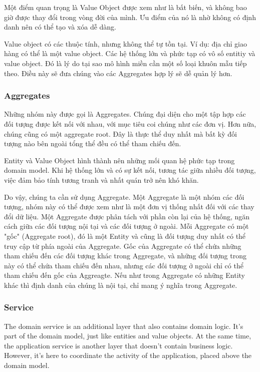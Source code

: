 Một điểm quan trọng là Value Object được xem như là bất biến, và không bao giờ được thay đổi trong vòng đời của mình. Ưu điểm của nó là nhờ không có định danh nên có thể tạo và xóa dễ dàng.

Value object có các thuộc tính, nhưng không thể tự tồn tại. Ví dụ: địa chỉ giao hàng có thể là một value object. Các hệ thống lớn và phức tạp có vô số entitiy và value object. Đó là lý do tại sao mô hình miền cần một số loại khuôn mẫu tiếp theo. Điều này sẽ đưa chúng vào các Aggregates hợp lý sẽ dễ quản lý hơn.

\subsubsection{Aggregates}

Những nhóm này được gọi là Aggregates. Chúng đại diện cho một tập hợp các đối tượng được kết nối với nhau, với mục tiêu coi chúng như các đơn vị. Hơn nữa, chúng cũng có một aggregate root. Đây là thực thể duy nhất mà bất kỳ đối tượng nào bên ngoài tổng thể đều có thể tham chiếu đến.

Entity và Value Object hình thành nên những mối quan hệ phức tạp trong domain model. Khi hệ thống lớn và có sự kết nối, tương tác giữa nhiều đối tượng, việc đảm bảo tính tương tranh và nhất quán trở nên khó khăn.

Do vậy, chúng ta cần sử dụng Aggregate. Một Aggregate là một nhóm các đối tượng, nhóm này có thể được xem như là một đơn vị thống nhất đối với các thay đổi dữ liệu. Một Aggregate được phân tách với phần còn lại của hệ thống, ngăn cách giữa các đối tượng nội tại và các đối tượng ở ngoài. Mỗi Aggregate có một "gốc" (Aggregate root), đó là một Entity và cũng là đối tượng duy nhất có thể truy cập từ phía ngoài của Aggregate. Gốc của Aggregate có thể chứa những tham chiếu đến các đối tượng khác trong Aggregate, và những đối tượng trong này có thể chứa tham chiếu đến nhau, nhưng các đối tượng ở ngoài chỉ có thể tham chiếu đến gốc của Aggreagte. Nếu như trong Aggregate có những Entity khác thì định danh của chúng là nội tại, chỉ mang ý nghĩa trong Aggregate.

\subsubsection{Service}

The domain service is an additional layer that also contains domain logic. It’s part of the domain model, just like entities and value objects. At the same time, the application service is another layer that doesn’t contain business logic. However, it’s here to coordinate the activity of the application, placed above the domain model.

